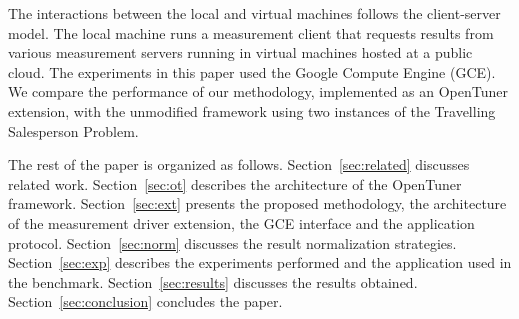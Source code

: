 The interactions between the local and virtual machines follows the
client-server model. The local machine runs a measurement client that requests
results from various measurement servers running in virtual machines hosted at
a public cloud. The experiments in this paper used the Google Compute Engine
(GCE).  We compare the performance of our methodology, implemented as an
OpenTuner extension, with the unmodified framework using two instances of the
Travelling Salesperson Problem.

The rest of the paper is organized as follows.
Section~\ref{sec:related} discusses related work.
Section~\ref{sec:ot} describes the architecture of the OpenTuner framework.
Section~\ref{sec:ext} presents the proposed methodology, the architecture of
the measurement driver extension, the GCE interface and the application
protocol.
Section~\ref{sec:norm} discusses the result normalization strategies.
Section~\ref{sec:exp} describes the experiments performed and the
application used in the benchmark.
Section~\ref{sec:results} discusses the results obtained.
Section~\ref{sec:conclusion} concludes the paper.
